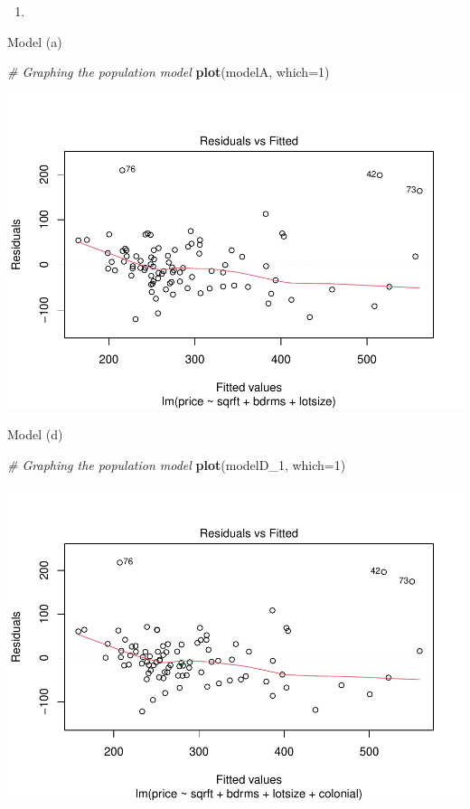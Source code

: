 \documentclass[
  12pt,
  landscape]{article}
\newenvironment{Shaded}{\begin{snugshade}}{\end{snugshade}}
\newcommand{\CommentTok}[1]{\textcolor[rgb]{0.56,0.35,0.01}{\textit{#1}}}
\newcommand{\DataTypeTok}[1]{\textcolor[rgb]{0.13,0.29,0.53}{#1}}
\newcommand{\DecValTok}[1]{\textcolor[rgb]{0.00,0.00,0.81}{#1}}
\newcommand{\KeywordTok}[1]{\textcolor[rgb]{0.13,0.29,0.53}{\textbf{#1}}}
\newcommand{\NormalTok}[1]{#1}
\begin{document}
\begin{enumerate}
\def\labelenumi{(\alph{enumi})}
\setcounter{enumi}{6}
\item
\end{enumerate}

Model (a)

\begin{Shaded}
\begin{Highlighting}[]
\CommentTok{# Graphing the population model }
\KeywordTok{plot}\NormalTok{(modelA, }\DataTypeTok{which=}\DecValTok{1}\NormalTok{)}
\end{Highlighting}
\end{Shaded}

\includegraphics{Ogle_MicroMetricsAssignment_2_Q2_files/figure-latex/unnamed-chunk-5-1.pdf}

Model (d)

\begin{Shaded}
\begin{Highlighting}[]
\CommentTok{# Graphing the population model }
\KeywordTok{plot}\NormalTok{(modelD_}\DecValTok{1}\NormalTok{, }\DataTypeTok{which=}\DecValTok{1}\NormalTok{)}
\end{Highlighting}
\end{Shaded}

\includegraphics{Ogle_MicroMetricsAssignment_2_Q2_files/figure-latex/unnamed-chunk-6-1.pdf}
\end{document}
